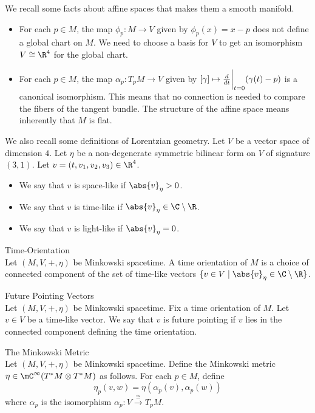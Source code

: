 \documentclass[a4paper]{article}
\begin{document}
We recall some facts about affine spaces that makes them a smooth manifold. 
\begin{itemize}
\item For each $p\in M$, the map $\phi_p:M\to V$ given by $\phi_p(x)=x-p$ does not define a global chart on $M$. We need to choose a basis for $V$ to get an isomorphism $V\cong\R^4$ for the global chart. 
\item For each $p\in M$, the map $\alpha_p:T_pM\to V$ given by $[\gamma]\mapsto\frac{d}{dt}\bigg{|}_{t=0}(\gamma(t)-p)$ is a canonical isomorphism. This means that no connection is needed to compare the fibers of the tangent bundle. The structure of the affine space means inherently that $M$ is flat. 
\end{itemize}
We also recall some definitions of Lorentzian geometry. Let $V$ be a vector space of dimension $4$. Let $\eta$ be a non-degenerate symmetric bilinear form on $V$ of signature $(3,1)$. Let $v=(t,v_1,v_2,v_3)\in\R^4$. 
\begin{itemize}
\item We say that $v$ is space-like if $\abs{v}_\eta>0$. 
\item We say that $v$ is time-like if $\abs{v}_\eta\in\C\setminus\R$. 
\item We say that $v$ is light-like if $\abs{v}_\eta=0$. 
\end{itemize}

\begin{defn}{Time-Orientation}{}\\
Let $(M,V,+,\eta)$ be Minkowski spacetime. A time orientation of $M$ is a choice of connected component of the set of time-like vectors $\{v\in V\;|\;\abs{v}_\eta\in\C\setminus\R\}$. 
\end{defn}

\begin{defn}{Future Pointing Vectors}{}\\
Let $(M,V,+,\eta)$ be Minkowski spacetime. Fix a time orientation of $M$. Let $v\in V$ be a time-like vector. We say that $v$ is future pointing if $v$ lies in the connected component defining the time orientation. 
\end{defn}

\begin{defn}{The Minkowski Metric}{}\\
Let $(M,V,+,\eta)$ be Minkowski spacetime. Define the Minkowski metric $\eta\in\mC^\infty(T^\ast M\otimes T^\ast M)$ as follows. For each $p\in M$, define $$\eta_p(v,w)=\eta(\alpha_p(v),\alpha_p(w))$$ where $\alpha_p$ is the isomorphism $\alpha_p:V\overset{\cong}{\longrightarrow}T_pM$. 
\end{defn}
\end{document}

